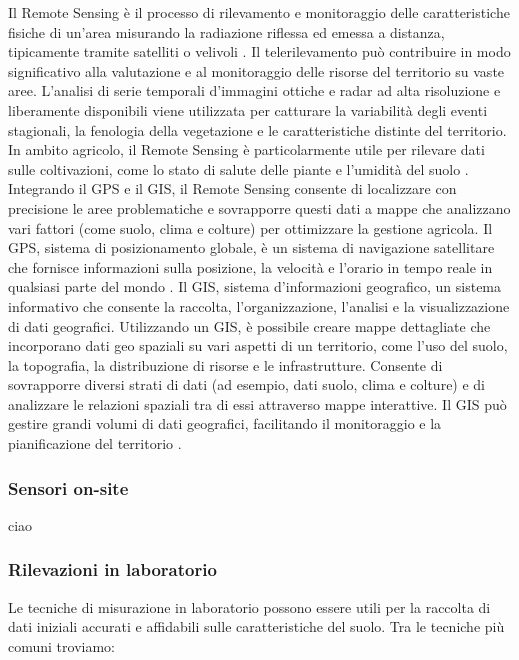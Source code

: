 \documentclass[12pt,a4paper,openright,twoside]{book}
\begin{document}
Il Remote Sensing è il processo di rilevamento e monitoraggio delle caratteristiche fisiche di un'area misurando la radiazione riflessa ed emessa a distanza, tipicamente tramite satelliti o velivoli \cite{USGS-REMOTE-SENSING}.
Il telerilevamento può contribuire in modo significativo alla valutazione e al monitoraggio delle risorse del territorio su vaste aree. L'analisi di serie temporali d'immagini ottiche e radar ad alta risoluzione e liberamente disponibili viene utilizzata per catturare la variabilità degli eventi stagionali, la fenologia della vegetazione e le caratteristiche distinte del territorio.
In ambito agricolo, il Remote Sensing è particolarmente utile per rilevare dati sulle coltivazioni, come lo stato di salute delle piante e l'umidità del suolo \cite{FAO-REMOTE-SENSING}. Integrando il \ac{GPS} e il \ac{GIS}, il Remote Sensing consente di localizzare con precisione le aree problematiche e sovrapporre questi dati a mappe che analizzano vari fattori (come suolo, clima e colture) per ottimizzare la gestione agricola.
Il \ac{GPS}, sistema di posizionamento globale, è un sistema di navigazione satellitare che fornisce informazioni sulla posizione, la velocità e l'orario in tempo reale in qualsiasi parte del mondo \cite{GPS-GOV}.
Il \ac{GIS}, sistema d'informazioni geografico, un sistema informativo che consente la raccolta, l'organizzazione, l'analisi e la visualizzazione di dati geografici. Utilizzando un GIS, è possibile creare mappe dettagliate che incorporano dati geo spaziali su vari aspetti di un territorio, come l'uso del suolo, la topografia, la distribuzione di risorse e le infrastrutture. Consente di sovrapporre diversi strati di dati (ad esempio, dati suolo, clima e colture) e di analizzare le relazioni spaziali tra di essi attraverso mappe interattive. Il GIS può gestire grandi volumi di dati geografici, facilitando il monitoraggio e la pianificazione del territorio \cite{GIS-ESRI}.

\subsubsection{Sensori on-site}
ciao

\subsubsection{Rilevazioni in laboratorio}

Le tecniche di misurazione in laboratorio possono essere utili per la raccolta di dati iniziali accurati e affidabili sulle caratteristiche del suolo. Tra le tecniche più comuni troviamo:
\end{document}
